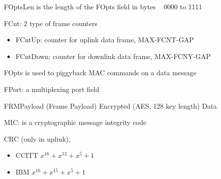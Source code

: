 \begin{landscape}
\begin{multicols}{2}
\begin{itemize}
{{{{					\item FOptsLen  is the length of the FOpts field in bytes   0000 to 1111 

				}
				\item FCnt:  2 type of frame counters 
				\begin{itemize}
					\item FCntUp:  counter for uplink data frame, MAX-FCNT-GAP
					\item FCntDown:  counter for downlink data frame, MAX-FCNY-GAP
				\end{itemize}
				         
				\item FOpts  is used to piggyback MAC commands on a data message	
			}

			\item FPort:  a multiplexing port field

		    \item FRMPayload (Frame Payload)  Encrypted (AES, 128 key length) Data                                 
		}

		\item MIC:  is a cryptographic message integrity code
	}
	\item CRC  (only in uplink), 
	\begin{itemize}
		\item CCITT  $x^{16} + x^{12} + x^{5} + 1$
		\item IBM  $x^{16} + x^{15} + x^{5} + 1$
	\end{itemize}
\end{itemize}

\end{multicols}


\end{landscape}


